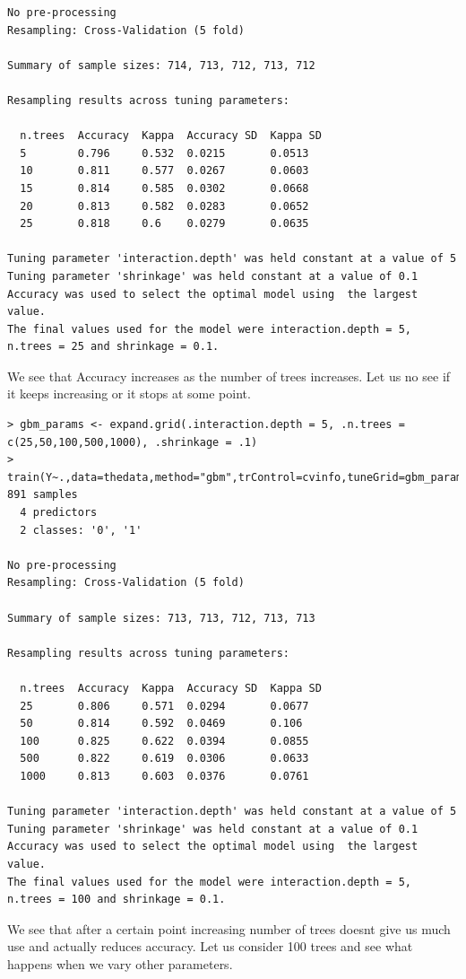 \documentclass[fontsize=10pt]{scrartcl}
\begin{document}
\begin{enumerate}
\begin{verbatim}
No pre-processing
Resampling: Cross-Validation (5 fold) 

Summary of sample sizes: 714, 713, 712, 713, 712 

Resampling results across tuning parameters:

  n.trees  Accuracy  Kappa  Accuracy SD  Kappa SD
  5        0.796     0.532  0.0215       0.0513  
  10       0.811     0.577  0.0267       0.0603  
  15       0.814     0.585  0.0302       0.0668  
  20       0.813     0.582  0.0283       0.0652  
  25       0.818     0.6    0.0279       0.0635  

Tuning parameter 'interaction.depth' was held constant at a value of 5
Tuning parameter 'shrinkage' was held constant at a value of 0.1
Accuracy was used to select the optimal model using  the largest value.
The final values used for the model were interaction.depth = 5, n.trees = 25 and shrinkage = 0.1. 
\end{verbatim}

			We see that Accuracy increases as the number of trees increases. Let us no see if it keeps increasing or it stops at some point.

\begin{verbatim}
> gbm_params <- expand.grid(.interaction.depth = 5, .n.trees = c(25,50,100,500,1000), .shrinkage = .1)
> train(Y~.,data=thedata,method="gbm",trControl=cvinfo,tuneGrid=gbm_params)
891 samples
  4 predictors
  2 classes: '0', '1' 

No pre-processing
Resampling: Cross-Validation (5 fold) 

Summary of sample sizes: 713, 713, 712, 713, 713 

Resampling results across tuning parameters:

  n.trees  Accuracy  Kappa  Accuracy SD  Kappa SD
  25       0.806     0.571  0.0294       0.0677  
  50       0.814     0.592  0.0469       0.106   
  100      0.825     0.622  0.0394       0.0855  
  500      0.822     0.619  0.0306       0.0633  
  1000     0.813     0.603  0.0376       0.0761  

Tuning parameter 'interaction.depth' was held constant at a value of 5
Tuning parameter 'shrinkage' was held constant at a value of 0.1
Accuracy was used to select the optimal model using  the largest value.
The final values used for the model were interaction.depth = 5, n.trees = 100 and shrinkage = 0.1. 
\end{verbatim}
			We see that after a certain point increasing number of trees doesnt give us much use and actually reduces accuracy. Let us consider 100 trees and see what happens when we vary other parameters.


\end{enumerate}
\end{document}
